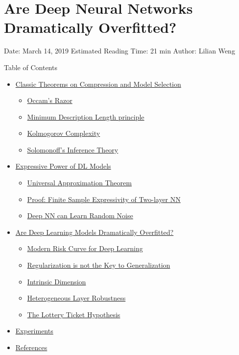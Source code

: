 \section{Are Deep Neural Networks Dramatically Overfitted?}\label{are-deep-neural-networks-dramatically-overfitted}

Date: March 14, 2019 \textbar{} Estimated Reading Time: 21 min \textbar{} Author: Lilian Weng

{Table of Contents}

\begin{itemize}
\tightlist
\item
  \hyperref[classic-theorems-on-compression-and-model-selection]{Classic Theorems on Compression and Model Selection}

  \begin{itemize}
  \tightlist
  \item
    \hyperref[occams-razor]{Occam's Razor}
  \item
    \hyperref[minimum-description-length-principle]{Minimum Description Length principle}
  \item
    \hyperref[kolmogorov-complexity]{Kolmogorov Complexity}
  \item
    \hyperref[solomonoffs-inference-theory]{Solomonoff's Inference Theory}
  \end{itemize}
\item
  \hyperref[expressive-power-of-dl-models]{Expressive Power of DL Models}

  \begin{itemize}
  \tightlist
  \item
    \hyperref[universal-approximation-theorem]{Universal Approximation Theorem}
  \item
    \hyperref[proof-finite-sample-expressivity-of-two-layer-nn]{Proof: Finite Sample Expressivity of Two-layer NN}
  \item
    \hyperref[deep-nn-can-learn-random-noise]{Deep NN can Learn Random Noise}
  \end{itemize}
\item
  \hyperref[are-deep-learning-models-dramatically-overfitted]{Are Deep Learning Models Dramatically Overfitted?}

  \begin{itemize}
  \tightlist
  \item
    \hyperref[modern-risk-curve-for-deep-learning]{Modern Risk Curve for Deep Learning}
  \item
    \hyperref[regularization-is-not-the-key-to-generalization]{Regularization is not the Key to Generalization}
  \item
    \hyperref[intrinsic-dimension]{Intrinsic Dimension}
  \item
    \hyperref[heterogeneous-layer-robustness]{Heterogeneous Layer Robustness}
  \item
    \hyperref[the-lottery-ticket-hypothesis]{The Lottery Ticket Hypothesis}
  \end{itemize}
\item
  \hyperref[experiments]{Experiments}
\item
  \hyperref[references]{References}
\end{itemize}

